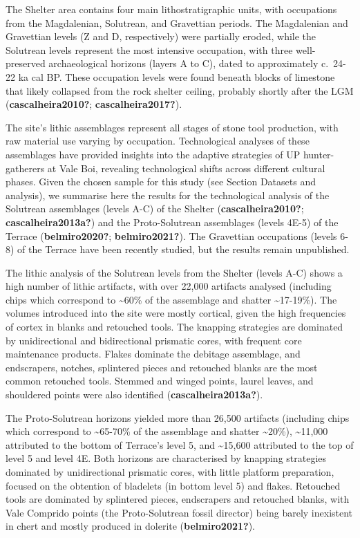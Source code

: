 \documentclass[
  a4paper,
  DIV=11,
  numbers=noendperiod]{scrreprt}
\begin{document}
The Shelter area contains four main lithostratigraphic units, with
occupations from the Magdalenian, Solutrean, and Gravettian periods. The
Magdalenian and Gravettian levels (Z and D, respectively) were partially
eroded, while the Solutrean levels represent the most intensive
occupation, with three well-preserved archaeological horizons (layers A
to C), dated to approximately c.~24-22 ka cal BP. These occupation
levels were found beneath blocks of limestone that likely collapsed from
the rock shelter ceiling, probably shortly after the LGM
(\textbf{cascalheira2010?}; \textbf{cascalheira2017?}).

The site's lithic assemblages represent all stages of stone tool
production, with raw material use varying by occupation. Technological
analyses of these assemblages have provided insights into the adaptive
strategies of UP hunter-gatherers at Vale Boi, revealing technological
shifts across different cultural phases. Given the chosen sample for
this study (see Section Datasets and analysis), we summarise here the
results for the technological analysis of the Solutrean assemblages
(levels A-C) of the Shelter (\textbf{cascalheira2010?};
\textbf{cascalheira2013a?}) and the Proto-Solutrean assemblages (levels
4E-5) of the Terrace (\textbf{belmiro2020?}; \textbf{belmiro2021?}). The
Gravettian occupations (levels 6-8) of the Terrace have been recently
studied, but the results remain unpublished.

The lithic analysis of the Solutrean levels from the Shelter (levels
A-C) shows a high number of lithic artifacts, with over 22,000 artifacts
analysed (including chips which correspond to \textasciitilde60\% of the
assemblage and shatter \textasciitilde17-19\%). The volumes introduced
into the site were mostly cortical, given the high frequencies of cortex
in blanks and retouched tools. The knapping strategies are dominated by
unidirectional and bidirectional prismatic cores, with frequent core
maintenance products. Flakes dominate the debitage assemblage, and
endscrapers, notches, splintered pieces and retouched blanks are the
most common retouched tools. Stemmed and winged points, laurel leaves,
and shouldered points were also identified (\textbf{cascalheira2013a?}).

The Proto-Solutrean horizons yielded more than 26,500 artifacts
(including chips which correspond to \textasciitilde65-70\% of the
assemblage and shatter \textasciitilde20\%), \textasciitilde11,000
attributed to the bottom of Terrace's level 5, and \textasciitilde15,600
attributed to the top of level 5 and level 4E. Both horizons are
characterised by knapping strategies dominated by unidirectional
prismatic cores, with little platform preparation, focused on the
obtention of bladelets (in bottom level 5) and flakes. Retouched tools
are dominated by splintered pieces, endscrapers and retouched blanks,
with Vale Comprido points (the Proto-Solutrean fossil director) being
barely inexistent in chert and mostly produced in dolerite
(\textbf{belmiro2021?}).
\end{document}
